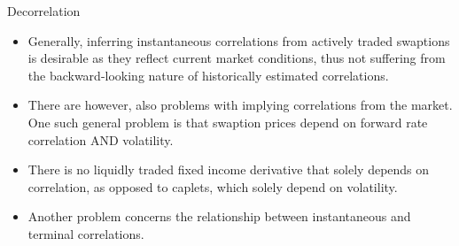 \documentclass{beamer}
\begin{document}
\begin{frame}{Decorrelation}
\begin{itemize}
	\item<1-> Generally, inferring instantaneous correlations from actively traded swaptions is desirable as they reflect current market conditions, thus not suffering from the backward-looking nature of historically estimated correlations. 
	\item<2-> There are however, also problems with implying correlations from the market. One such general problem is that swaption prices depend on forward rate correlation AND volatility. 
	\item<3-> There is no liquidly traded fixed income derivative that solely depends on correlation, as opposed to caplets, which solely depend on volatility.
	\item<4-> Another problem concerns the relationship between instantaneous and terminal correlations.
\end{itemize}
\end{frame}	
	 
\end{document}
